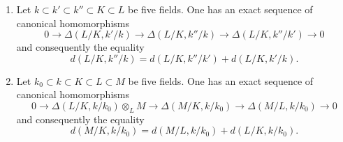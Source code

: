 \begin{proposition}[21.6.4]
\label{0.21.6.4}
\begin{enumerate}
  \item[\rm (i)] Let $k\subset k'\subset k''\subset K\subset L$ be five fields.
  One has an exact sequence of canonical homomorphisms
  \begin{equation}
  \tag{21.6.4.1}
  \label{0.21.6.4.1}
    0\to\Delta(L/K,k'/k)\to\Delta(L/K,k''/k)\to\Delta(L/K,k''/k')\to 0
  \end{equation}
  and consequently the equality
  \begin{equation}
  \tag{21.6.4.2}
  \label{0.21.6.4.2}
    d(L/K,k''/k)=d(L/K,k''/k')+d(L/K,k'/k).
  \end{equation}
  \item[\rm (ii)] Let $k_0\subset k\subset K\subset L\subset M$ be five fields.
  One has an exact sequence of canonical homomorphisms
  \begin{equation}
  \tag{21.6.4.3}
  \label{0.21.6.4.3}
    0\to\Delta(L/K,k/k_0)\otimes_L M\to\Delta(M/K,k/k_0)\to\Delta(M/L,k/k_0)\to 0
  \end{equation}
  and consequently the equality
  \begin{equation}
  \tag{21.6.4.4}
  \label{0.21.6.4.4}
    d(M/K,k/k_0)=d(M/L,k/k_0)+d(L/K,k/k_0).
  \end{equation}
\end{enumerate}
\end{proposition}

